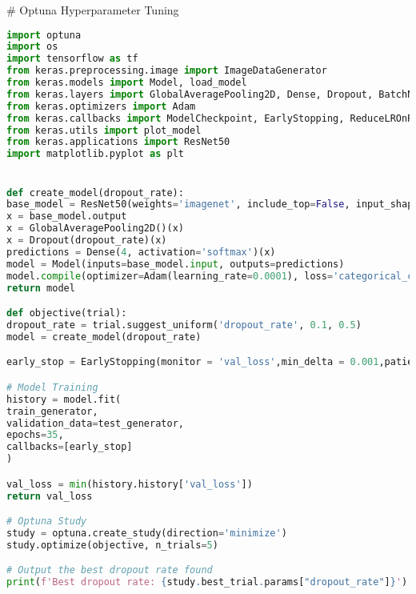 # Optuna Hyperparameter Tuning
\begin{lstlisting}[language=Python]
import optuna
import os
import tensorflow as tf
from keras.preprocessing.image import ImageDataGenerator
from keras.models import Model, load_model
from keras.layers import GlobalAveragePooling2D, Dense, Dropout, BatchNormalization
from keras.optimizers import Adam
from keras.callbacks import ModelCheckpoint, EarlyStopping, ReduceLROnPlateau
from keras.utils import plot_model
from keras.applications import ResNet50
import matplotlib.pyplot as plt


def create_model(dropout_rate):
base_model = ResNet50(weights='imagenet', include_top=False, input_shape=(224, 224, 3))
x = base_model.output
x = GlobalAveragePooling2D()(x)
x = Dropout(dropout_rate)(x)
predictions = Dense(4, activation='softmax')(x)
model = Model(inputs=base_model.input, outputs=predictions)
model.compile(optimizer=Adam(learning_rate=0.0001), loss='categorical_crossentropy', metrics=['accuracy'])
return model

def objective(trial):
dropout_rate = trial.suggest_uniform('dropout_rate', 0.1, 0.5)
model = create_model(dropout_rate)

early_stop = EarlyStopping(monitor = 'val_loss',min_delta = 0.001,patience = 20,mode = 'min',restore_best_weights = True,verbose = 1)

# Model Training
history = model.fit(
train_generator,
validation_data=test_generator,
epochs=35,
callbacks=[early_stop]
)

val_loss = min(history.history['val_loss'])
return val_loss

# Optuna Study
study = optuna.create_study(direction='minimize')
study.optimize(objective, n_trials=5)

# Output the best dropout rate found
print(f'Best dropout rate: {study.best_trial.params["dropout_rate"]}')
\end{lstlisting}

